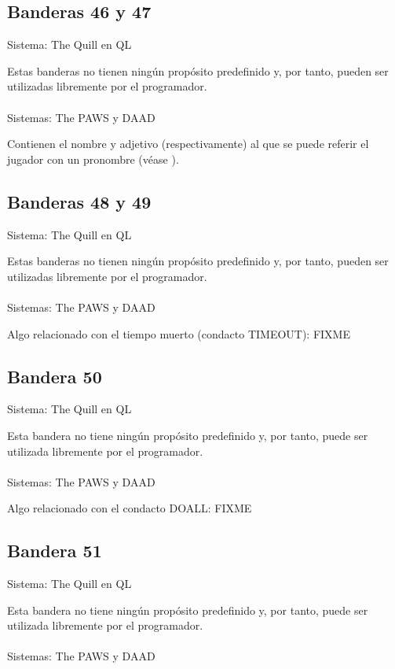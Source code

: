 \documentclass[11pt, a5paper]{article}
\newcommand{\quill}{\textsf{The Quill}\xspace}
\newcommand{\paw}{\textsf{The PAWS}\xspace}
\newcommand{\daad}{\textsf{DAAD}\xspace}
\newcommand{\sistema}[1]{\noindent Sistema: #1 \nopagebreak}
\newcommand{\sistemas}[1]{\noindent Sistemas: #1 \nopagebreak}
\begin{document}
\subsection{Banderas 46 y 47}

\sistema{\quill en QL}

Estas banderas no tienen ningún propósito predefinido y, por tanto, pueden ser utilizadas libremente por el programador.
\\\ \\
\sistemas{\paw y \daad}

Contienen el nombre y adjetivo (respectivamente) al que se puede referir el jugador con un pronombre (véase \textbf{}).

\subsection{Banderas 48 y 49}

\sistema{\quill en QL}

Estas banderas no tienen ningún propósito predefinido y, por tanto, pueden ser utilizadas libremente por el programador.
\\\ \\
\sistemas{\paw y \daad}

Algo relacionado con el tiempo muerto (condacto TIMEOUT): FIXME

\subsection{Bandera 50}

\sistema{\quill en QL}

Esta bandera no tiene ningún propósito predefinido y, por tanto, puede ser utilizada libremente por el programador.
\\\ \\
\sistemas{\paw y \daad}

Algo relacionado con el condacto DOALL: FIXME

\subsection{Bandera 51}

\sistema{\quill en QL}

Esta bandera no tiene ningún propósito predefinido y, por tanto, puede ser utilizada libremente por el programador.
\\\ \\
\sistemas{\paw y \daad}
\end{document}

